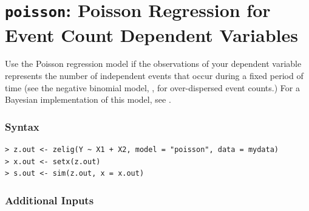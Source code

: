 

\usepackage{Sweave}

\nobibliography*


\section{{\tt poisson}: Poisson Regression for Event Count
Dependent Variables}\label{poisson}

Use the Poisson regression model if the observations of your dependent
variable represents the number of independent events that occur during
a fixed period of time (see the negative binomial model, ,
for over-dispersed event counts.)  For a Bayesian implementation of
this model, see .  

\subsubsection{Syntax}

\begin{verbatim}
> z.out <- zelig(Y ~ X1 + X2, model = "poisson", data = mydata)
> x.out <- setx(z.out)
> s.out <- sim(z.out, x = x.out)
\end{verbatim}

\subsubsection{Additional Inputs} 

